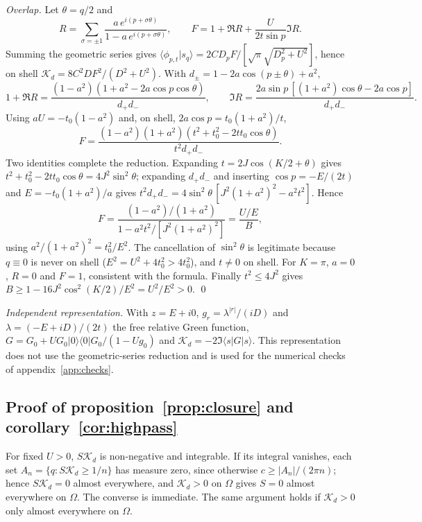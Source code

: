 \documentclass[12pt,a4paper]{article}
\theoremstyle{remark}
\newcommand{\Kd}{\mathcal{K}_d}
\begin{document}
\emph{Overlap.} Let $\theta=q/2$ and
\begin{equation}
R=\sum_{\sigma=\pm1}\frac{a\,e^{i(p+\sigma\theta)}}{1-a\,e^{i(p+\sigma\theta)}},\qquad F=1+\Re R+\frac{U}{2t\sin p}\Im R .
\end{equation}
Summing the geometric series gives $\langle\phi_{p,t}|s_q\rangle=2CD_pF/[\sqrt\pi\sqrt{D_p^2+U^2}]$, hence on shell $\Kd=8C^2DF^2/(D^2+U^2)$. With $d_\pm=1-2a\cos(p\pm\theta)+a^2$,
\begin{equation}
1+\Re R=\frac{(1-a^2)(1+a^2-2a\cos p\cos\theta)}{d_+d_-},\qquad
\Im R=\frac{2a\sin p\,[(1+a^2)\cos\theta-2a\cos p]}{d_+d_-}.
\end{equation}
Using $aU=-t_0(1-a^2)$ and, on shell, $2a\cos p=t_0(1+a^2)/t$,
\begin{equation}
F=\frac{(1-a^2)(1+a^2)(t^2+t_0^2-2tt_0\cos\theta)}{t^2d_+d_-}.
\end{equation}
Two identities complete the reduction. Expanding $t=2J\cos(K/2+\theta)$ gives $t^2+t_0^2-2tt_0\cos\theta=4J^2\sin^2\theta$; expanding $d_+d_-$ and inserting $\cos p=-E/(2t)$ and $E=-t_0(1+a^2)/a$ gives $t^2d_+d_-=4\sin^2\theta\,[J^2(1+a^2)^2-a^2t^2]$. Hence
\begin{equation}
F=\frac{(1-a^2)/(1+a^2)}{1-a^2t^2/[J^2(1+a^2)^2]}=\frac{U/E}{B},
\end{equation}
using $a^2/(1+a^2)^2=t_0^2/E^2$. The cancellation of $\sin^2\theta$ is legitimate because $q\equiv0$ is never on shell ($E^2=U^2+4t_0^2>4t_0^2$), and $t\neq0$ on shell. For $K=\pi$, $a=0$, $R=0$ and $F=1$, consistent with the formula. Finally $t^2\le4J^2$ gives $B\ge1-16J^2\cos^2(K/2)/E^2=U^2/E^2>0$. \qed

\emph{Independent representation.} With $z=E+i0$, $g_r=\lambda^{|r|}/(iD)$ and $\lambda=(-E+iD)/(2t)$ the free relative Green function, $G=G_0+UG_0|0\rangle\langle0|G_0/(1-Ug_0)$ and $\Kd=-2\Im\langle s|G|s\rangle$. This representation does not use the geometric-series reduction and is used for the numerical checks of appendix~\ref{app:checks}.

\subsection{Proof of proposition~\ref{prop:closure} and corollary~\ref{cor:highpass}}\label{app:P4}

For fixed $U>0$, $S\Kd$ is non-negative and integrable. If its integral vanishes, each set $A_n=\{q:S\Kd\ge1/n\}$ has measure zero, since otherwise $c\ge|A_n|/(2\pi n)$; hence $S\Kd=0$ almost everywhere, and $\Kd>0$ on $\Omega$ gives $S=0$ almost everywhere on $\Omega$. The converse is immediate. The same argument holds if $\Kd>0$ only almost everywhere on $\Omega$.
\end{document}
